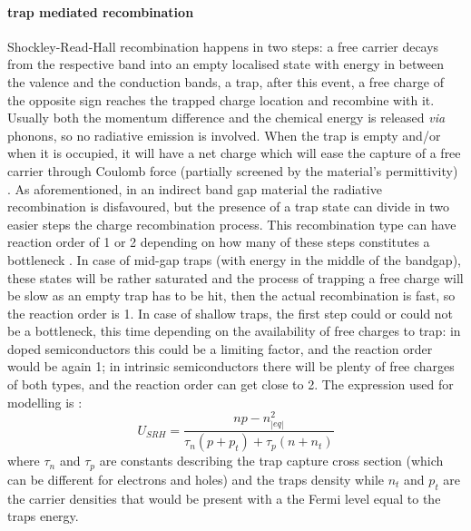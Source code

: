 		\paragraph{ trap mediated recombination}
		Shockley-Read-Hall recombination \cite{Shockley1952} happens in two steps: a free carrier decays from the respective band into an empty localised state with energy in between the valence and the conduction bands, a trap, after this event, a free charge of the opposite sign reaches the trapped charge location and recombine with it.		
		Usually both the momentum difference and the chemical energy is released \textsl{via} phonons, so no radiative emission is involved.
		When the trap is empty and/or when it is occupied, it will have a net charge which will ease the capture of a free carrier through Coulomb force (partially screened by the material's permittivity) \cite{Kirchartz2018,Kirchartz2019}.
		As aforementioned, in an indirect band gap material the radiative recombination is disfavoured, but the presence of a trap state can divide in two easier steps the charge recombination process.
		This recombination type can have reaction order of 1 or 2 depending on how many of these steps constitutes a bottleneck \cite{Calado2019}.
		In case of mid-gap traps (with energy in the middle of the bandgap), these states will be rather saturated and the process of trapping a free charge will be slow as an empty trap has to be hit, then the actual recombination is fast, so the reaction order is 1.
		In case of shallow traps, the first step could or could not be a bottleneck, this time depending on the availability of free charges to trap: in doped semiconductors this could be a limiting factor, and the reaction order would be again 1; in intrinsic semiconductors there will be plenty of free charges of both types, and the reaction order can get close to 2.
		The expression used for modelling is \cite{Shockley1952,Nelson2003}:
		\begin{equation}\label{eq:srh}
			U_{SRH} = \frac{np-n_|eq|^2}{\tau_n(p+p_t)+ \tau_p(n+n_t)}
		\end{equation}
		where $\tau_n$ and $\tau_p$ are constants describing the trap capture cross section (which can be different for electrons and holes) and the traps density while $n_t$ and $p_t$ are the carrier densities that would be present with a the Fermi level equal to the traps energy.
